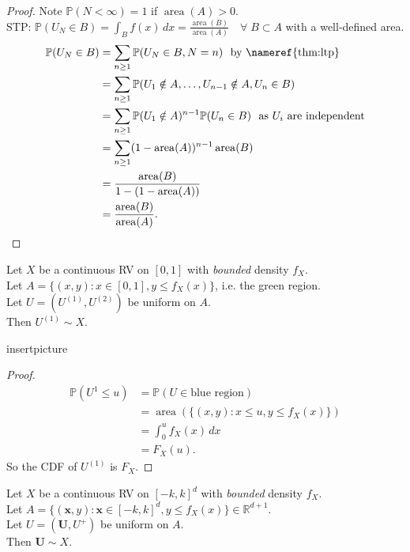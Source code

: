 \begin{proof}
    Note $\mathbb{P}(N < \infty) = 1$ if $\operatorname{area}(A) > 0$. \\
    STP: $\mathbb{P}(U_N \in B) = \int_B f(x) \, dx = \frac{\operatorname{area}(B)}{\operatorname{area}(A)} \quad \forall \; B \subset A$ with a well-defined area. 
    \begin{align*}
        \mathbb{P}(U_N \in B) &= \sum_{n \geq 1} \mathbb{P}(U_N \in B, N = n) \ \text{ by \nameref{thm:ltp}} \\
        &= \sum_{n \geq 1} \mathbb{P}(U_1 \notin A, \dots, U_{n - 1} \notin A, U_n \in B) \\
        &= \sum_{n \geq 1} \mathbb{P}(U_1 \notin A)^{n - 1} \mathbb{P}(U_n \in B) \ \text{ as $U_i$ are independent} \\
        &= \sum_{n \geq 1} (1 - \operatorname{area}(A))^{n - 1} \operatorname{area}(B) \\
        &= \frac{\operatorname{area}(B)}{1 - (1 - \operatorname{area}(A))} \\
        &= \frac{\operatorname{area}(B)}{\operatorname{area}(A)}.
    \end{align*} 
\end{proof} 

\begin{claim}
    Let $X$ be a continuous RV on $[0, 1]$ with \emph{bounded} density $f_X$. \\
    Let $A = \{(x, y): x \in [0, 1], y \leq f_X(x)\}$, i.e. the green region. \\
    Let $U = (U^{(1)}, U^{(2)})$ be uniform on $A$. \\
    Then $U^{(1)} \sim X$.
\end{claim} 

insertpicture

\begin{proof}
    \begin{align*}
        \mathbb{P}(U^{1} \leq u) &= \mathbb{P}(U \in \text{blue region}) \\
        &= \operatorname{area}(\{(x, y): x \leq u, y \leq f_X(x)\}) \\
        &= \int_{0}^{u} f_X(x) \,dx \\
        &= F_X(u).
    \end{align*} 
    So the CDF of $U^{(1)}$ is $F_X$.
\end{proof} 

\begin{claim}
    Let $X$ be a continuous RV on $[-k, k]^d$ with \emph{bounded} density $f_X$. \\
    Let $A = \{(\bm x, y): \bm x \in [-k, k]^d, y \leq f_X(x)\} \in \mathbb{R}^{d + 1}$. \\
    Let $U = (\bm U, U^+)$ be uniform on $A$. \\
    Then $\bm U \sim X$.
\end{claim} 

